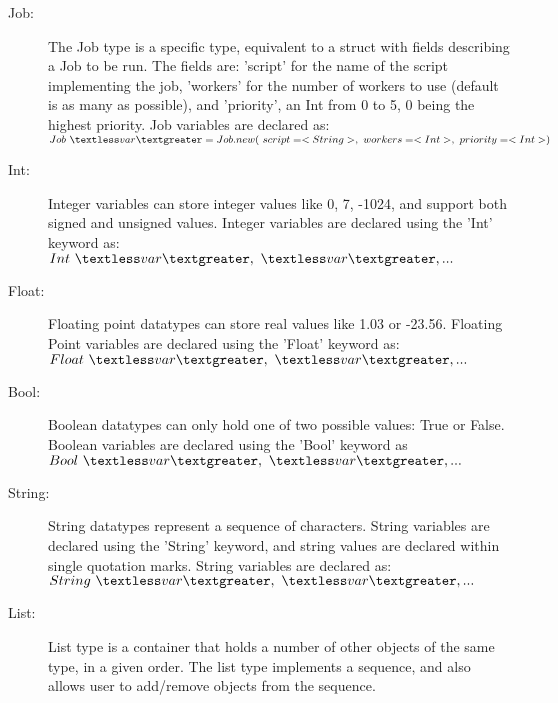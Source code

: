 \begin{description}
\item [Job:] The Job type is a \lang{} specific type, equivalent to a struct
with fields describing a Job to be run. The fields are: 'script' for the
name of the script implementing the job, 'workers' for the number of workers to use
(default is as many as possible), and 'priority', an Int from 0 to 5, 0 being the
highest priority.
Job variables are declared as:
$Job~\textless var\textgreater = Job.new(~script=<String>,~workers=<Int>,~priority=<Int>)$

\item [Int:] Integer variables can store integer values like 0, 7, -1024,
and support both signed and unsigned values. Integer variables are declared
using the 'Int' keyword as:
$Int~\textless var\textgreater,~\textless var\textgreater, ...$


\item [Float:] Floating point datatypes can store real values like 1.03 or -23.56.
Floating Point variables are declared using the 'Float' keyword as:
$Float~\textless  var\textgreater,~\textless  var\textgreater, ...$



\item [Bool:] Boolean datatypes can only hold one of two possible values:
True or False. Boolean variables are declared using the 'Bool' keyword as
$Bool~\textless  var\textgreater,~\textless  var\textgreater, ...$
%



\item [String:] String datatypes represent a sequence of characters. String
variables are declared using the 'String' keyword, and string values are 
declared within single quotation marks.
String variables are declared as:
$String~\textless var\textgreater,~\textless  var\textgreater, ...$


\item [List:]
List type is a container that holds a number of other objects of the same type,
in a given order. The list type implements a sequence, and also allows user to
add/remove objects from the sequence.


\end{description}

